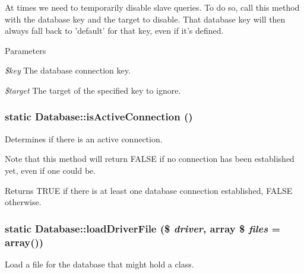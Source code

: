 At times we need to temporarily disable slave queries. To do so, call this method with the database key and the target to disable. That database key will then always fall back to 'default' for that key, even if it's defined.


\begin{DoxyParams}{Parameters}
\item[{\em \$key}]The database connection key. \item[{\em \$target}]The target of the specified key to ignore. \end{DoxyParams}
\hypertarget{classDatabase_ac67e96fee55a1ec6820a6678428d7b91}{
\subsubsection[{isActiveConnection}]{\setlength{\rightskip}{0pt plus 5cm}static Database::isActiveConnection ()}}
\label{classDatabase_ac67e96fee55a1ec6820a6678428d7b91}
Determines if there is an active connection.

Note that this method will return FALSE if no connection has been established yet, even if one could be.

\begin{DoxyReturn}{Returns}
TRUE if there is at least one database connection established, FALSE otherwise. 
\end{DoxyReturn}
\hypertarget{classDatabase_a25fe33ffa87aaf80ff680e356230d9e2}{
\subsubsection[{loadDriverFile}]{\setlength{\rightskip}{0pt plus 5cm}static Database::loadDriverFile (\$ {\em driver}, \/  array \$ {\em files} = {\ttfamily array()})}}
\label{classDatabase_a25fe33ffa87aaf80ff680e356230d9e2}
Load a file for the database that might hold a class.



